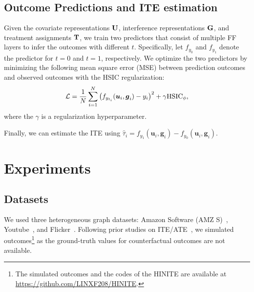 \documentclass[runningheads]{llncs}
\begin{document}
\subsection{Outcome Predictions and ITE estimation}
Given the covariate representations $\bold{U}$,  interference representations $\bold{G}$, and treatment assignments $\bold{T}$, we train two predictors that consist of multiple FF layers to infer the outcomes with different $t$.
Specifically, let $f_{y_0}$ and $f_{y_1}$  denote the predictor for $t=0$ and $t=1$, respectively. We optimize the two predictors by minimizing the following mean square error (MSE) between prediction outcomes and observed outcomes with the HSIC regularization:
\begin{equation}
\mathcal{L} = \frac{1}{N}\sum^{N}_{i=1}\left(f_{y_{t_i}}(\boldsymbol{u}_i,\boldsymbol{g}_i)-y_{i}\right)^2 +  \gamma \rm{HSIC}_{\phi},
\end{equation}
where the $\gamma$ is a regularization hyperparameter.

Finally, we can estimate the ITE using 
$
    \hat{\tau}_i=f_{y_1}(\boldsymbol{u}_i,\boldsymbol{g}_i)-f_{y_0}(\boldsymbol{u}_i,\boldsymbol{g}_i).
$





\section{Experiments}
\subsection{Datasets}
We used three heterogeneous graph datasets: Amazon Software (AMZ S)~\cite{he2016ups}, Youtube~\cite{tang2009uncoverning},  and 
 Flicker~\cite{wang2013learning}. Following prior studies on ITE/ATE~\cite{pmlr-v130-ma21c,ma2022learning,pmlr-v70-shalit17a}, we simulated outcomes\footnote{The simulated outcomes and the codes of the HINITE are available at \url{https://github.com/LINXF208/HINITE}.} as the ground-truth values for counterfactual outcomes are not available.
 
\end{document}
